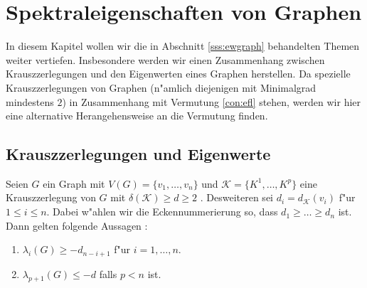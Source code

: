 \section{Spektraleigenschaften von Graphen}

In diesem Kapitel wollen wir die in Abschnitt \ref{sss:ewgraph} behandelten Themen weiter vertiefen. Insbesondere werden wir einen Zusammenhang zwischen Krauszzerlegungen und den Eigenwerten eines Graphen herstellen. Da spezielle Krauszzerlegungen von Graphen (n"amlich diejenigen mit Minimalgrad mindestens $2$) in Zusammenhang mit Vermutung \ref{con:efl} stehen, werden wir hier eine alternative Herangehensweise an die Vermutung finden. 

\subsection{Krauszzerlegungen und Eigenwerte}
\begin{theorem}
  \label{thm:KrauszEigenwerte}
  Seien $G$ ein Graph mit $V(G)=\{v_1,\dots,v_n\}$ und $\mathcal K=\{K^1,\dots,K^p\}$ eine Krauszzerlegung von $G$ mit $\delta(\mathcal K) \geq d \geq 2$ . Desweiteren sei $d_i = d_{\mathcal{K}}(v_{i})$ f"ur $1\leq i \leq n$. 
  Dabei w"ahlen wir die Eckennummerierung so, dass $d_1 \geq \dots \geq d_{n}$ ist.
  Dann gelten folgende Aussagen : 
  \begin{enumerate}[label=\rm{(\alph*)}]
    \item $\lambda_i(G) \geq -d_{n-i+1}$ f"ur $i = 1, \dots , n$.
    \item $\lambda_{p+1}(G) \leq -d$ falls $p < n$ ist.
  \end{enumerate}
\end{theorem}

